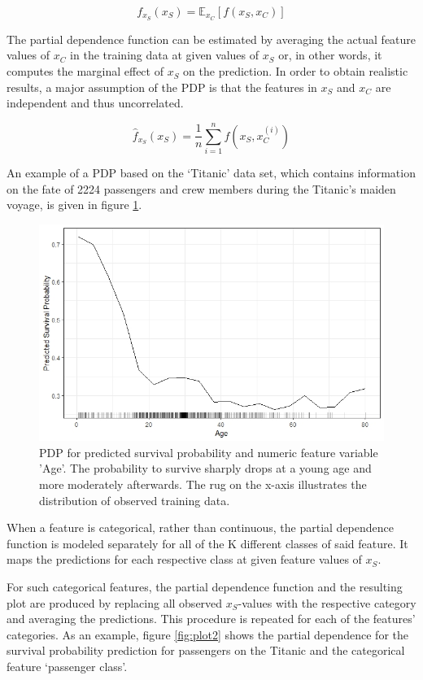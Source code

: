 \documentclass[
]{krantz}
\begin{document}
\[f_{x_S}(x_S) = \mathbb{E}_{x_C}[f(x_S, x_C)]\]

The partial dependence function can be estimated by averaging the actual feature values of \(x_C\) in the training data at given values of \(x_S\) or, in other words, it computes the marginal effect of \(x_S\) on the prediction. In order to obtain realistic results, a major assumption of the PDP is that the features in \(x_S\) and \(x_C\) are independent and thus uncorrelated.\citep{hastie2013elements}

\[\hat{f}_{x_S}(x_S)=\frac{1}{n}\sum_{i=1}^{n}f(x_S, x^{(i)}_{C})\]

An example of a PDP based on the `Titanic' data set, which contains information on the fate of 2224 passengers and crew members during the Titanic's maiden voyage, is given in figure \ref{fig:plot1}.

\begin{figure}

{\centering \includegraphics[width=0.8\linewidth]{images/PDP_Plot_1} 

}

\caption{PDP for predicted survival probability and numeric feature variable 'Age'. The probability to survive sharply drops at a young age and more moderately afterwards. The rug on the x-axis illustrates the distribution of observed training data.}\label{fig:plot1}
\end{figure}

When a feature is categorical, rather than continuous, the partial dependence function is modeled separately for all of the K different classes of said feature. It maps the predictions for each respective class at given feature values of \(x_S\).\citep{hastie2013elements}

For such categorical features, the partial dependence function and the resulting plot are produced by replacing all observed \(x_S\)-values with the respective category and averaging the predictions. This procedure is repeated for each of the features' categories.\citep{molnar2019} As an example, figure \ref{fig:plot2} shows the partial dependence for the survival probability prediction for passengers on the Titanic and the categorical feature `passenger class'.
\end{document}
